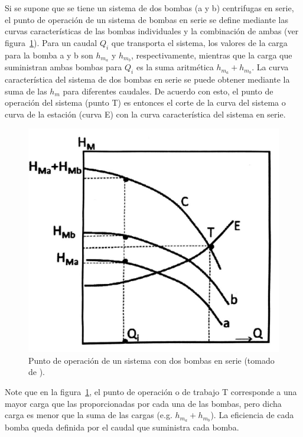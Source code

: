 \documentclass[11pt, oneside]{article}
\begin{document}
Si se supone que se tiene un sistema de dos  bombas (a y b) centrifugas en serie, el punto de operaci\'on de un sistema de bombas en serie se define mediante las curvas caracter\'isticas de las bombas individuales y la combinaci\'on de ambas (ver figura~\ref{bom23}). Para un caudal $Q_i$ que transporta el sistema, los valores de la carga para la bomba a y b son $h_{m_a}$ y $h_{m_b}$, respectivamente, mientras que la carga que suministran ambas bombas para $Q_i$ es la suma aritm\'etica $h_{m_a}+h_{m_b}$. La curva caracter\'istica del sistema de dos bombas en serie se puede obtener mediante la suma de las $h_m$ para diferentes caudales. De acuerdo con esto, el punto de operaci\'on del sistema (punto T) es entonces el corte de la curva del sistema  o curva de la estaci\'on (curva E) con la curva caracter\'istica del sistema en serie.  

\begin{figure}[h]
\centering
\includegraphics[width=12cm]{./figs/bom23.jpeg}
\caption{Punto de operaci\'on de un sistema con dos bombas en serie (tomado de \cite{agudelo2011mecanica}).} 
\label{bom23}
\end{figure}


Note que en la figura~\ref{bom23}, el punto de operaci\'on o de trabajo T corresponde a una mayor carga que las proporcionadas por cada una de las bombas, pero dicha carga es menor que la suma de las cargas (e.g. $h_{m_a}+ h_{m_b}$). La eficiencia de cada bomba queda definida por el caudal que suministra cada bomba. 





\end{document}
